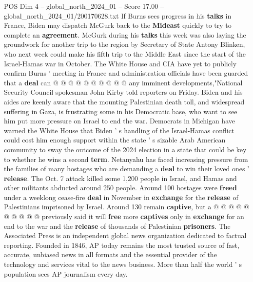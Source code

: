 \begin{textsample}{POS Dim 4 – global\_north\_2024\_01 – Score 17.00 – global\_north\_2024\_01/200170628.txt}
If Burns sees progress in his \textbf{talks} in France, Biden may dispatch McGurk back to the \textbf{Mideast} quickly to try to complete an \textbf{agreement}.
McGurk during his \textbf{talks} this week was also laying the groundwork for another trip to the region by Secretary of State Antony Blinken, who next week could make his fifth trip to the Middle East since the start of the Israel-Hamas war in October.
The White House and CIA have yet to publicly confirm Burns ' meeting in France and administration officials have been guarded that a \textbf{deal} can @ @ @ @ @ @ @ @ @ @ any imminent developments,"National Security Council spokesman John Kirby told reporters on Friday.
Biden and his aides are keenly aware that the mounting Palestinian death toll, and widespread suffering in Gaza, is frustrating some in his Democratic base, who want to see him put more pressure on Israel to end the war.
Democrats in Michigan have warned the White House that Biden ' s handling of the Israel-Hamas conflict could cost him enough support within the state ' s sizable Arab American community to sway the outcome of the 2024 election in a state that could be key to whether he wins a second \textbf{term}.
Netanyahu has faced increasing pressure from the families of many hostages who are demanding a \textbf{deal} to win their loved ones ' \textbf{release}.
The Oct. 7 attack killed some 1,200 people in Israel, and Hamas and other militants abducted around 250 people.
Around 100 hostages were \textbf{freed} under a weeklong cease-fire \textbf{deal} in November in \textbf{exchange} for the \textbf{release} of Palestinians imprisoned by Israel.
Around 130 remain \textbf{captive}, but a @ @ @ @ @ @ @ @ @ @ previously said it will \textbf{free} more \textbf{captives} only in \textbf{exchange} for an end to the war and the \textbf{release} of thousands of Palestinian \textbf{prisoners}.
The Associated Press is an independent global news organization dedicated to factual reporting.
Founded in 1846, AP today remains the most trusted source of fast, accurate, unbiased news in all formats and the essential provider of the technology and services vital to the news business.
More than half the world ' s population sees AP journalism every day.

\end{textsample}

